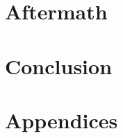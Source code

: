 \documentclass[12pt]{article}
\begin{document}


\section{Aftermath}

\section{Conclusion}


\section*{Appendices}

\newpage
\printbibliography
\end{document}
